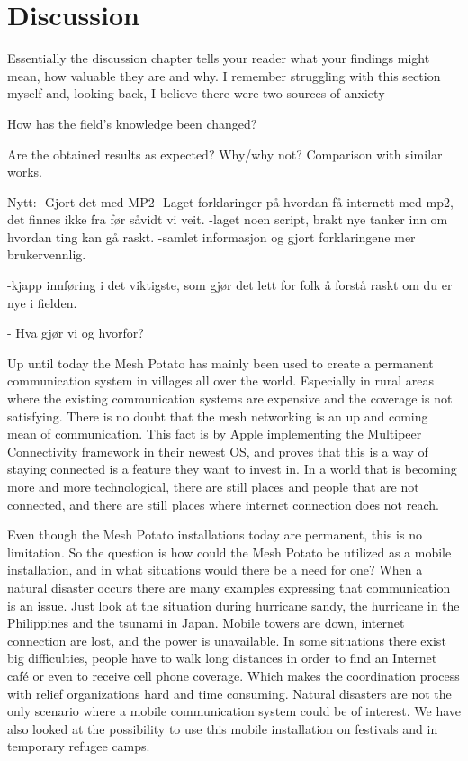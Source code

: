 \chapter{Discussion}
\label{chp:discussion} 

Essentially the discussion chapter tells your reader what your findings might mean, how valuable they are and why. I remember struggling with this section myself and, looking back, I believe there were two sources of anxiety

How has the field's knowledge been changed?

Are the obtained results as expected? Why/why not?
Comparison with similar works. 

Nytt:
-Gjort det med MP2
-Laget forklaringer på hvordan få internett med mp2, det finnes ikke fra før såvidt vi veit. 
-laget noen script, brakt nye tanker inn om hvordan ting kan gå raskt. 
-samlet informasjon og gjort forklaringene mer brukervennlig.

-kjapp innføring i det viktigste, som gjør det lett for folk å forstå raskt om du er nye i fielden. 

- Hva gjør vi og hvorfor?

Up until today the Mesh Potato has mainly been used to create a permanent communication system in villages all over the world. Especially in rural areas where the existing communication systems are expensive and the coverage is not satisfying. There is no doubt that the mesh networking is an up and coming mean of communication. This fact is  by Apple implementing the Multipeer Connectivity framework in their newest OS, and proves that this is a way of staying connected is a feature they want to invest in. In a world that is becoming more and more technological, there are still places and people that are not connected, and there are still places where internet connection does not reach. 

Even though the Mesh Potato installations today are permanent, this is no limitation. So the question is how could the Mesh Potato be utilized as a mobile installation, and in what situations would there be a need for one? When a natural disaster occurs there are many examples expressing that communication is an issue. Just look at the situation during hurricane sandy, the hurricane in the Philippines and the tsunami in Japan. Mobile towers are down, internet connection are lost, and the power is unavailable. In some situations there exist big difficulties, people have to walk long distances in order to find an Internet café or even to receive cell phone coverage. Which makes the coordination process with relief organizations hard and time consuming. Natural disasters are not the only scenario where a mobile communication system could be of interest. We have also looked at the possibility to use this mobile installation on festivals and in temporary refugee camps. 

